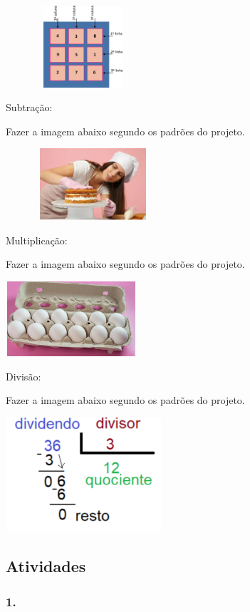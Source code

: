 \includegraphics[width=2.26282in,height=1.19473in]{media/image14.png}

Subtração:

Fazer a imagem abaixo segundo os padrões do projeto.

\includegraphics[width=2.55128in,height=1.04961in]{media/image15.png}

Multiplicação:

Fazer a imagem abaixo segundo os padrões do projeto.

\includegraphics[width=1.92308in,height=1.09649in]{media/image16.png}

Divisão:

Fazer a imagem abaixo segundo os padrões do projeto.

\includegraphics[width=2.26923in,height=1.66995in]{media/image17.png}

\subsection{Atividades}\label{atividades-1}

\subsubsection{1.}\label{section-16}

